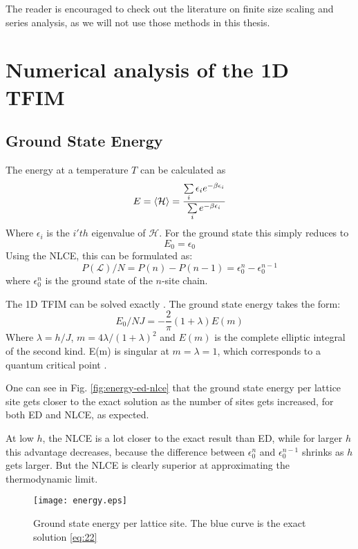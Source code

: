 \documentclass[a4paper,12pt]{article}
\begin{document}
The reader is encouraged to check out the literature on finite size
scaling and series analysis, as we will not use those methods in this thesis.

\section{Numerical analysis of the 1D TFIM}
\subsection{Ground State Energy}

The energy at a temperature $T$ can be calculated as
\begin{equation}
\label{eq:28}
E = \braket{\mathcal{H}} = \frac{\sum\limits_i \epsilon_i
  e^{-\beta \epsilon_i}}{\sum\limits_i e^{- \beta \epsilon_i}}
\end{equation}
Where $\epsilon_i$ is the $i'th$ eigenvalue of $\mathcal{H}$. For the
ground state this simply reduces to
\begin{equation}
\label{eq:29}
E_0 = \epsilon_0
\end{equation}
Using the NLCE, this can be formulated as:
\begin{equation}
\label{eq:30}
P(\mathcal{L})/N = P(n) - P(n-1) = \epsilon_0^n - \epsilon_0^{n-1}
\end{equation}
where $\epsilon_0^n$ is the ground state of the $n$-site chain.

The 1D TFIM can be solved exactly \cite{Pfeuty}. The ground state
energy takes the form:
\begin{equation}
\label{eq:22}
E_0/NJ = - \frac{2}{\pi} (1+ \lambda)E(m)
\end{equation}
Where $\lambda = h/J$, $m= 4\lambda /(1+\lambda)^2$ and $E(m)$ is the
complete elliptic integral of the second kind. E(m) is singular at $m
= \lambda = 1$, which corresponds to a quantum critical point
\cite{Series}.

One can see in Fig. \eqref{fig:energy-ed-nlce} that the ground state energy per lattice site gets closer
to the exact solution as the number of sites gets increased, for both
ED and NLCE, as expected.



At low $h$, the NLCE is a lot closer to the exact result than ED, while for larger $h$
this advantage decreases, because the difference between
$\epsilon_0^n$ and $\epsilon_0^{n-1}$ shrinks as $h$ gets larger. But
the NLCE is clearly superior at approximating the thermodynamic limit.
\begin{figure}[htbp]
\centerline{\texttt{[image: energy.eps]}}
\caption[]{\label{fig:energy-ed-nlce} Ground state energy per lattice
  site. The blue curve is the exact solution \eqref{eq:22}}
\end{figure}
\end{document}
